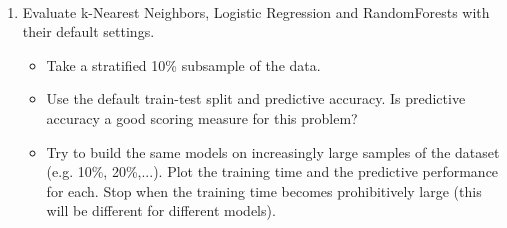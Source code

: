 \documentclass[11pt]{article}
\providecommand{\tightlist}{%
      \setlength{\itemsep}{0pt}\setlength{\parskip}{0pt}}
\begin{document}
    \begin{center}
    \end{center}
    { \hspace*{\fill} \\}
    
    \begin{enumerate}
\def\labelenumi{\arabic{enumi}.}
\tightlist
\item
  Evaluate k-Nearest Neighbors, Logistic Regression and RandomForests
  with their default settings.

  \begin{itemize}
  \tightlist
  \item
    Take a stratified 10\% subsample of the data.
  \item
    Use the default train-test split and predictive accuracy. Is
    predictive accuracy a good scoring measure for this problem?
  \item
    Try to build the same models on increasingly large samples of the
    dataset (e.g. 10\%, 20\%,...). Plot the training time and the
    predictive performance for each. Stop when the training time becomes
    prohibitively large (this will be different for different models).
  \end{itemize}
\end{enumerate}
\end{document}
